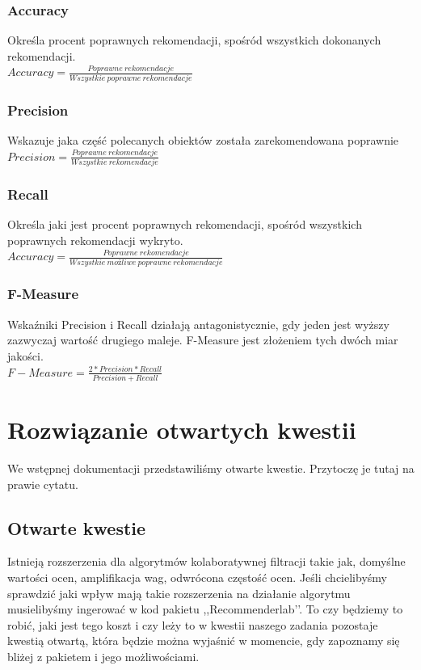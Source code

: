 \documentclass[12pt, a4paper]{article}
\begin{document}
\subsubsection{Accuracy}
Określa procent poprawnych rekomendacji, spośród wszystkich dokonanych rekomendacji.\\
$Accuracy = \frac{Poprawne\:rekomendacje}{Wszystkie \:poprawne\: rekomendacje}$
\subsubsection{Precision}
Wskazuje jaka część polecanych obiektów została zarekomendowana poprawnie\\
$Precision = \frac{Poprawne \:rekomendacje}{Wszystkie\: rekomendacje}$
\subsubsection{Recall}
Określa jaki jest procent poprawnych rekomendacji, spośród wszystkich poprawnych rekomendacji wykryto.\\
$Accuracy = \frac{Poprawne\:rekomendacje}{Wszystkie \:możliwe \:poprawne\: rekomendacje}$
\subsubsection{F-Measure}
Wskaźniki Precision i Recall działają antagonistycznie, gdy jeden jest wyższy zazwyczaj wartość drugiego maleje. F-Measure jest złożeniem tych dwóch miar jakości.\\
$F-Measure = \frac{2*Precision*Recall}{Precision + Recall}$


\section{Rozwiązanie otwartych kwestii}
We wstępnej dokumentacji przedstawiliśmy otwarte kwestie. Przytoczę je tutaj na prawie cytatu.

\subsection{Otwarte kwestie}
Istnieją rozszerzenia dla algorytmów kolaboratywnej filtracji takie jak, domyślne wartości ocen, amplifikacja wag, odwrócona częstość ocen. Jeśli chcielibyśmy sprawdzić jaki wpływ mają takie rozszerzenia na działanie algorytmu musielibyśmy ingerować w kod pakietu ,,Recommenderlab’’. To czy będziemy to robić, jaki jest tego koszt i czy leży to w kwestii naszego zadania pozostaje kwestią otwartą, która będzie można wyjaśnić w momencie, gdy zapoznamy się bliżej z pakietem i jego możliwościami.
\end{document}
